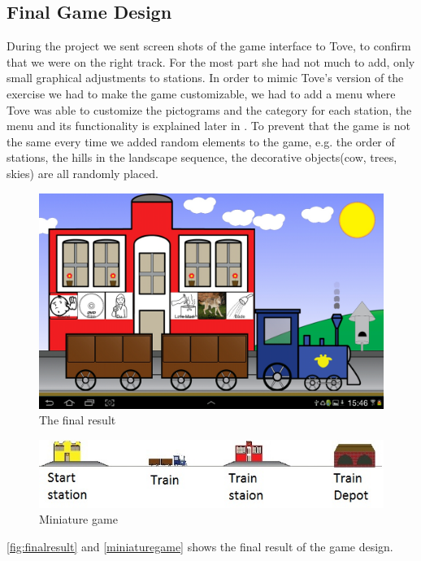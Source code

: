 \subsection{Final Game Design}
\label{designgameinterface}
During the project we sent screen shots of the game interface to Tove, to confirm that we were on the right track. For the most part she had not much to add, only small graphical adjustments to stations. 
In order to mimic Tove's version of the exercise we had to make the game customizable, we had to add a menu where Tove was able to customize the pictograms and the category for each station, the menu and its functionality is explained later in . To prevent that the game is not the same every time we added random elements to the game, e.g. the order of stations, the hills in the landscape sequence, the decorative objects(cow, trees, skies) are all randomly placed. 
\begin{figure}[H]
\centering
\includegraphics[width=0.9\linewidth]{img/screenshots/gamedesign1.jpg}%
\caption{The final result}
\label{fig:finalresult}
\end{figure}
\begin{figure}[H]
\centering
\includegraphics[width=0.9\linewidth]{img/screenshots/stations.jpg}%
\caption{Miniature game}
\label{fig:miniaturegame}
\end{figure}
\autoref{fig:finalresult} and \autoref{miniaturegame} shows the final result of the game design.
